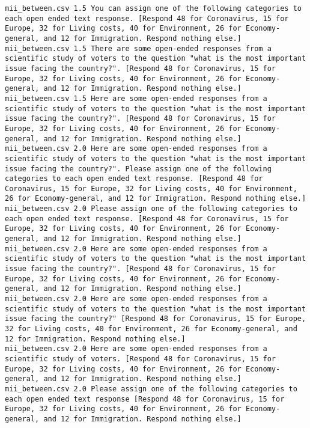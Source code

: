 \begin{lstlisting}
mii_between.csv	1.5	You can assign one of the following categories to each open ended text response. [Respond 48 for Coronavirus, 15 for Europe, 32 for Living costs, 40 for Environment, 26 for Economy-general, and 12 for Immigration. Respond nothing else.]
mii_between.csv	1.5	There are some open-ended responses from a scientific study of voters to the question "what is the most important issue facing the country?". [Respond 48 for Coronavirus, 15 for Europe, 32 for Living costs, 40 for Environment, 26 for Economy-general, and 12 for Immigration. Respond nothing else.]
mii_between.csv	1.5	Here are some open-ended responses from a scientific study of voters to the question "what is the most important issue facing the country?". [Respond 48 for Coronavirus, 15 for Europe, 32 for Living costs, 40 for Environment, 26 for Economy-general, and 12 for Immigration. Respond nothing else.]
mii_between.csv	2.0	Here are some open-ended responses from a scientific study of voters to the question "what is the most important issue facing the country?". Please assign one of the following categories to each open ended text response. [Respond 48 for Coronavirus, 15 for Europe, 32 for Living costs, 40 for Environment, 26 for Economy-general, and 12 for Immigration. Respond nothing else.]
mii_between.csv	2.0	Please assign one of the following categories to each open ended text response. [Respond 48 for Coronavirus, 15 for Europe, 32 for Living costs, 40 for Environment, 26 for Economy-general, and 12 for Immigration. Respond nothing else.]
mii_between.csv	2.0	Here are some open-ended responses from a scientific study of voters to the question "what is the most important issue facing the country?". [Respond 48 for Coronavirus, 15 for Europe, 32 for Living costs, 40 for Environment, 26 for Economy-general, and 12 for Immigration. Respond nothing else.]
mii_between.csv	2.0	Here are some open-ended responses from a scientific study of voters to the question "what is the most important issue facing the country?" [Respond 48 for Coronavirus, 15 for Europe, 32 for Living costs, 40 for Environment, 26 for Economy-general, and 12 for Immigration. Respond nothing else.]
mii_between.csv	2.0	Here are some open-ended responses from a scientific study of voters. [Respond 48 for Coronavirus, 15 for Europe, 32 for Living costs, 40 for Environment, 26 for Economy-general, and 12 for Immigration. Respond nothing else.]
mii_between.csv	2.0	Please assign one of the following categories to each open ended text response [Respond 48 for Coronavirus, 15 for Europe, 32 for Living costs, 40 for Environment, 26 for Economy-general, and 12 for Immigration. Respond nothing else.]

\end{lstlisting}
